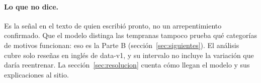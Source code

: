 \paragraph{Lo que no dice.} Es la señal en el texto de quien escribió pronto, no un arrepentimiento
confirmado. Que el modelo distinga las tempranas tampoco prueba qué categorías de motivos funcionan:
eso es la Parte B (sección~\ref{sec:siguientes}). El análisis cubre solo reseñas en inglés de
data-v1, y su intervalo no incluye la variación que daría reentrenar. La
sección~\ref{sec:resolucion} cuenta cómo llegan el modelo y sus explicaciones al sitio.
